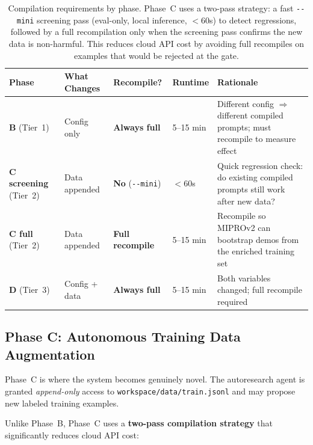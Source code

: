 \documentclass[11pt]{article}
\begin{document}
\begin{table}[h!]
\centering
\small
\begin{tabular}{@{}llllp{4.8cm}@{}}
\toprule
Phase & What Changes & Recompile? & Runtime & Rationale \\
\midrule
\textbf{B} (Tier~1) & Config only &
  \textbf{Always full} & 5--15 min &
  Different config $\Rightarrow$ different compiled prompts; must recompile to measure effect \\[4pt]
\textbf{C screening} (Tier~2) & Data appended &
  \textbf{No} (\texttt{-{}-mini}) & $<$60s &
  Quick regression check: do existing compiled prompts still work after new data? \\[4pt]
\textbf{C full} (Tier~2) & Data appended &
  \textbf{Full recompile} & 5--15 min &
  Recompile so MIPROv2 can bootstrap demos from the enriched training set \\[4pt]
\textbf{D} (Tier~3) & Config + data &
  \textbf{Always full} & 5--15 min &
  Both variables changed; full recompile required \\
\bottomrule
\end{tabular}
\caption{Compilation requirements by phase. Phase~C uses a two-pass
strategy: a fast \texttt{-{}-mini} screening pass (eval-only, local inference,
$<$60s) to detect regressions, followed by a full recompilation only
when the screening pass confirms the new data is non-harmful. This
reduces cloud API cost by avoiding full recompiles on examples that
would be rejected at the gate.}
\label{tab:compile_reqs}
\end{table}

\subsection{Phase C: Autonomous Training Data Augmentation}

Phase~C is where the system becomes genuinely novel. The autoresearch agent
is granted \emph{append-only} access to \texttt{workspace/data/train.jsonl}
and may propose new labeled training examples.

Unlike Phase~B, Phase~C uses a \textbf{two-pass compilation strategy}
that significantly reduces cloud API cost:
\end{document}
